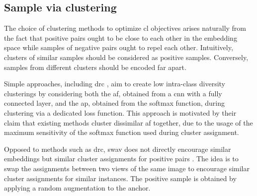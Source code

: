\subsection{Sample via clustering}
\label{subsec:SampleViaClustering}

The choice of clustering methods to optimize \ac{cl} objectives 
arises naturally from the fact that positive pairs ought to be close to each other in the embedding space 
while samples of negative pairs ought to repel each other.
Intuitively, clusters of similar samples should be considered as positive samples.
Conversely, samples from different clusters should be encoded far apart.

Simple approaches, including \ac{drc} \citet{DRC_2020}, aim to create low intra-class diversity clusterings 
by considering both the \ac{af}, obtained from a \ac{cnn} with a fully connected layer, 
and the \ac{ap}, obtained from the softmax function, during clustering via a dedicated loss function.
This approach is motivated by their claim that existing methods cluster dissimilar \ac{af} together,
due to the usage of the maximum sensitivity of the softmax function used during cluster assignment.

Opposed to methods such as \ac{drc}, \ac{swav} does not directly encourage similar embeddings but similar 
cluster assignments for positive pairs \citet{swav_2020}.
The idea is to swap the assignments between two views of the same image to encourage 
similar cluster assignments for similar instances.
The positive sample is obtained by applying a random augmentation to the anchor.






